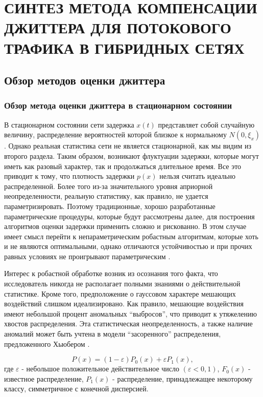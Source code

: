 \chapter{СИНТЕЗ МЕТОДА КОМПЕНСАЦИИ ДЖИТТЕРА ДЛЯ ПОТОКОВОГО ТРАФИКА В ГИБРИДНЫХ СЕТЯХ } \label{chapt:estim}

\section{Обзор методов оценки джиттера} \label{sect_analis_filters}
\subsection{Обзор метода оценки джиттера в стационарном состоянии}

В стационарном состоянии сети задержка $x(t)$ представляет собой случайную величину, распределение вероятностей которой близкое к нормальному $N(0,\xi_x)$ \cite{clark}. 
Однако реальная статистика сети не является стационарной, как мы видим из второго раздела. 
Таким образом, возникают флуктуации задержки, которые могут иметь как разовый характер, так и продолжаться длительное время.
Все это приводит к тому, что плотность задержки $p(x)$ нельзя считать идеально распределенной. 
Более того из-за значительного уровня априорной неопределенности, реальную статистику, как правило, не удается параметризировать. 
Поэтому традиционные, хорошо разработанные параметрические процедуры, которые будут рассмотрены далее, для построения алгоритмов оценки задержки применить сложно и рискованно. 
В этом случае имеет смысл перейти к непараметрическим робастным алгоритмам, которые хоть и не являются оптимальными, однако отличаются устойчивостью и при прочих равных условиях не проигрывают параметрическим \cite{tihonov}.

Интерес к робастной обработке возник из осознания того факта, что исследователь никогда не располагает полными знаниями о действительной статистике.
Кроме того, предположение о гауссовом характере мешающих воздействий слишком идеализировано.
Как правило, мешающие воздействия имеют небольшой процент аномальных ``выбросов'', что приводит к утяжелению хвостов распределения. 
Эта статистическая неопределенность, а также наличие аномалий может быть учтена в модели ``засоренного'' распределения, предложенного Хьюбером \cite{huber}.

\begin{equation}\label{eq3:huber}
P(x)=(1-\varepsilon)P_0(x)+\varepsilon P_1(x),
\end{equation}
\noindent где $\varepsilon$ - небольшое положительное действительное число $(\varepsilon<0,1)$, $F_0(x)$ - известное распределение, $P_1(x)$ - распределение, принадлежащее некоторому классу, симметричное с конечной дисперсией.

